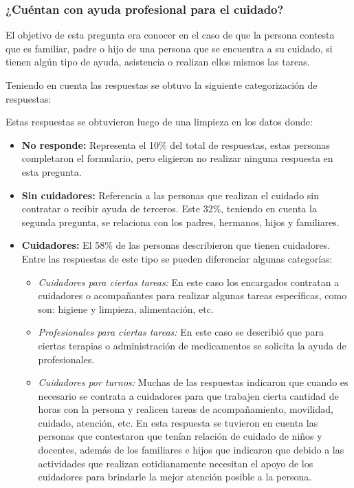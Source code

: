 \documentclass[a4paper,12pt]{article}
\begin{document}
    \subsubsection{¿Cuéntan con ayuda profesional para el cuidado?}
    \par El objetivo de esta pregunta era conocer en el caso de que la persona contesta que es familiar, padre o hijo de una persona que se encuentra a su cuidado, si tienen algún tipo de ayuda, asistencia o realizan ellos mismos las tareas.
    \par Teniendo en cuenta las respuestas se obtuvo la siguiente categorización de respuestas:
    \newline
    \newline
    \par Estas respuestas se obtuvieron luego de una limpieza en los datos donde:
    \begin{itemize}
        \item \textbf{No responde:} Representa el 10\% del total de respuestas, estas personas completaron el formulario, pero eligieron no realizar ninguna respuesta en esta pregunta.
        \item \textbf{Sin cuidadores:} Referencia a las personas que realizan el cuidado sin contratar o recibir ayuda de terceros. Este 32\%, teniendo en cuenta la segunda pregunta, se relaciona con los padres, hermanos, hijos y familiares. 
        \item \textbf{Cuidadores:} El 58\% de las personas describieron que tienen cuidadores. Entre las respuestas de este tipo se pueden diferenciar algunas categorías:
        \begin{itemize}
            \item \textit{Cuidadores para ciertas tareas:} En este caso los encargados contratan a cuidadores o acompañantes para realizar algunas tareas específicas, como son: higiene y limpieza, alimentación, etc.
            \item \textit{Profesionales para ciertas tareas:} En este caso se describió que para ciertas terapias o administración de medicamentos se solicita la ayuda de profesionales.
            \item \textit{Cuidadores por turnos:} Muchas de las respuestas indicaron que cuando es necesario se contrata a cuidadores para que trabajen cierta cantidad de horas con la persona y realicen tareas de acompañamiento, movilidad, cuidado, atención, etc. En esta respuesta se tuvieron en cuenta las personas que contestaron que tenían relación de cuidado de niños y docentes, además de los familiares e hijos que indicaron que debido a las actividades que realizan cotidianamente necesitan el apoyo de los cuidadores para brindarle la mejor atención posible a la persona.
        \end{itemize}
    \end{itemize}
\end{document}

